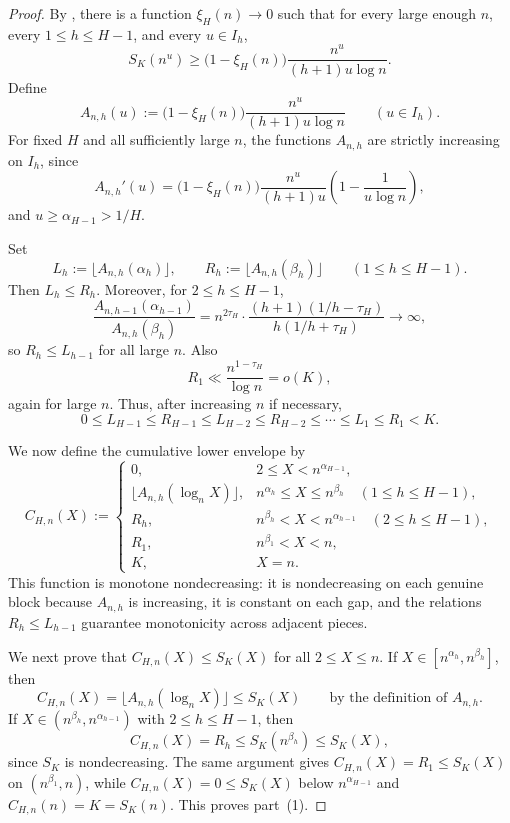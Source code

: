 \begin{proof}
By , there is a function $\xi_H(n)\to 0$ such that
for every large enough $n$, every $1\le h\le H-1$, and every $u\in I_h$,
\[
  S_K(n^u)
  \ge
  \bigl(1-\xi_H(n)\bigr)\frac{n^u}{(h+1)u\log n}.
\]
Define
\[
  A_{n,h}(u)
  :=
  \bigl(1-\xi_H(n)\bigr)\frac{n^u}{(h+1)u\log n}
  \qquad (u\in I_h).
\]
For fixed $H$ and all sufficiently large $n$, the functions $A_{n,h}$ are
strictly increasing on $I_h$, since
\[
  A_{n,h}'(u)
  =
  \bigl(1-\xi_H(n)\bigr)\frac{n^u}{(h+1)u}
  \left(1-\frac{1}{u\log n}\right),
\]
and $u\ge \alpha_{H-1}>1/H$.

Set
\[
  L_h := \lfloor A_{n,h}(\alpha_h)\rfloor,
  \qquad
  R_h := \lfloor A_{n,h}(\beta_h)\rfloor
  \qquad (1\le h\le H-1).
\]
Then $L_h\le R_h$.  Moreover, for $2\le h\le H-1$,
\[
  \frac{A_{n,h-1}(\alpha_{h-1})}{A_{n,h}(\beta_h)}
  =
  n^{2\tau_H}\cdot
  \frac{(h+1)(1/h-\tau_H)}{h(1/h+\tau_H)}
  \to \infty,
\]
so $R_h\le L_{h-1}$ for all large $n$.  Also
\[
  R_1 \ll \frac{n^{1-\tau_H}}{\log n}=o(K),
\]
again for large $n$.  Thus, after increasing $n$ if necessary,
\[
  0\le L_{H-1}\le R_{H-1}\le L_{H-2}\le R_{H-2}\le \cdots \le L_1\le R_1<K.
\]

We now define the cumulative lower envelope by
\[
  C_{H,n}(X):=
  \begin{cases}
    0, & 2\le X<n^{\alpha_{H-1}},\\[1mm]
    \lfloor A_{n,h}(\log_n X)\rfloor,
      & n^{\alpha_h}\le X\le n^{\beta_h}\quad (1\le h\le H-1),\\[1mm]
    R_h, & n^{\beta_h}<X<n^{\alpha_{h-1}}\quad (2\le h\le H-1),\\[1mm]
    R_1, & n^{\beta_1}<X<n,\\[1mm]
    K, & X=n.
  \end{cases}
\]
This function is monotone nondecreasing: it is nondecreasing on each genuine
block because $A_{n,h}$ is increasing, it is constant on each gap, and the
relations $R_h\le L_{h-1}$ guarantee monotonicity across adjacent pieces.

We next prove that $C_{H,n}(X)\le S_K(X)$ for all $2\le X\le n$.  If
$X\in[n^{\alpha_h},n^{\beta_h}]$, then
\[
  C_{H,n}(X)
  =
  \lfloor A_{n,h}(\log_n X)\rfloor
  \le
  S_K(X)
  \qquad
  \text{by the definition of $A_{n,h}$}.
\]
If $X\in(n^{\beta_h},n^{\alpha_{h-1}})$ with $2\le h\le H-1$, then
\[
  C_{H,n}(X)=R_h\le S_K(n^{\beta_h})\le S_K(X),
\]
since $S_K$ is nondecreasing.  The same argument gives
$C_{H,n}(X)=R_1\le S_K(X)$ on $(n^{\beta_1},n)$, while
$C_{H,n}(X)=0\le S_K(X)$ below $n^{\alpha_{H-1}}$ and
$C_{H,n}(n)=K=S_K(n)$.  This proves part~(1).


\end{proof}
